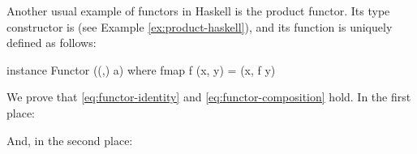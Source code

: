 
\begin{example}
  \label{ex:functor-product-haskell}


  Another usual example of functors in Haskell is the product functor.
  Its type constructor is  (see Example
  \ref{ex:product-haskell}), and its  function is
  uniquely defined as follows:
  \begin{codehaskell}
instance Functor ((,) a) where
  fmap f (x, y) = (x, f y)
  \end{codehaskell}


  We prove that \eqref{eq:functor-identity} and
  \eqref{eq:functor-composition} hold. In the first place:

  \begin{steps}
  \end{steps}
  And, in the second place:
  \begin{steps}
  \end{steps}

\end{example}

